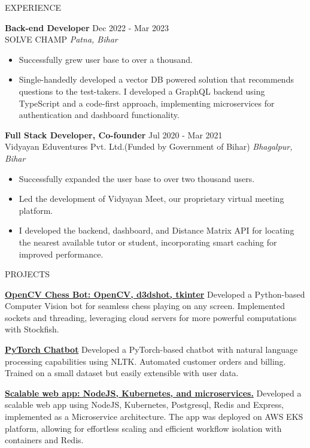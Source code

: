 \documentclass{resume} %
\begin{document}
\begin{rSection}{EXPERIENCE}

\textbf{Back-end Developer} \hfill Dec 2022 - Mar 2023\\
SOLVE CHAMP \hfill \textit{Patna, Bihar}
 \begin{itemize}
    \itemsep -3pt {} 
     \item Successfully grew user base to over a thousand.
     \item Single-handedly developed a vector DB powered solution that recommends questions to the test-takers.
    \itemI I developed a GraphQL backend using TypeScript and a code-first approach, implementing microservices for authentication and dashboard functionality. 
 \end{itemize}
 
\textbf{Full Stack Developer, Co-founder} \hfill Jul 2020 - Mar 2021\\
Vidyayan Eduventures Pvt. Ltd.(Funded by Government of Bihar) \hfill \textit{Bhagalpur, Bihar}
 \begin{itemize}
    \itemsep -3pt {} 
     \item Successfully expanded the user base to over two thousand users.
     \item Led the development of Vidyayan Meet, our proprietary virtual meeting platform.
    \item I developed the backend, dashboard, and Distance Matrix API for locating the nearest available tutor or student, incorporating smart caching for improved performance. 
 \end{itemize}

\end{rSection} 


\begin{rSection}{PROJECTS}
\vspace{-1.25em}
\item \textbf{\href{https://github.com/7dpk/OpenCV-Chess-Bot}{OpenCV Chess Bot: OpenCV, d3dshot, tkinter}} { Developed a Python-based Computer Vision bot for seamless chess playing on any screen. Implemented sockets and threading, leveraging cloud servers for more powerful computations with Stockfish.}
\item \textbf{\href{https://github.com/7dpk/pytorch-simple-chatbot}{PyTorch Chatbot}} {Developed a PyTorch-based chatbot with natural language processing capabilities using NLTK. Automated customer orders and billing. Trained on a small dataset but easily extensible with user data.}
\item \textbf{\href{https://github.com/7dpk/k8s-express-node-redis-postgres}{Scalable web app: NodeJS, Kubernetes, and microservices.}} {Developed a scalable web app using NodeJS, Kubernetes, Postgresql, Redis and Express, implemented as a Microservice architecture. The app was deployed on AWS EKS platform, allowing for effortless scaling and efficient workflow isolation with containers and Redis. }
\end{rSection} 
\end{document}
